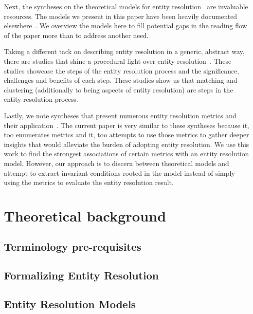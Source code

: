 \documentclass[journal]{IEEEtran}
\begin{document}
    Next, the syntheses on the theoretical models for entity
    resolution~\cite{fs1969,Ben2009Swoosh,Tal11} are invaluable resources.
    The models we present in this paper have been heavily documented
    elsewhere~\cite{Tal11,tal2013}.    
    We overview the models here to fill potential gaps in the reading flow of
    the paper more than to address another need.
    
    Taking a different tack on describing entity resolution in a generic,
    abstract way, there are studies that shine a procedural light over entity
    resolution~\cite{Pap19,Chen09}.
    These studies showcase the steps of the entity resolution process and the
    significance, challenges and benefits of each step.
    These studies show us that matching and clustering (additionally to being
    aspects of entity resolution) are steps in the entity resolution process.

    Lastly, we note syntheses that present numerous entity resolution metrics
    and their application~\cite{hitesh2012,graf2021frost,barnes2015practioner}.
    The current paper is very similar to these syntheses because it, too
    enumerates metrics and it, too attempts to use those metrics to gather
    deeper insights that would alleviate the burden of adopting entity
    resolution.
    We use this work to find the strongest associations of certain metrics with
    an entity resolution model.
    However, our approach is to discern between theoretical models and attempt
    to extract invariant conditions rooted in the model instead of simply using
    the metrics to evaluate the entity resolution result.

    \section{Theoretical background}
    \subsection[terminology]{Terminology pre-requisites}\label{sec:terminology}
    
    
    \subsection{Formalizing Entity Resolution}\label{sec:entity-resolution}
    

    \subsection[models]{Entity Resolution Models}\label{sec:models}
\end{document}

